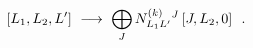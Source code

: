 \begin{equation}\label{mmDAflowI}
[L_{1},L_{2},L']\ \longrightarrow \ \makebox[6cm][l]{$\displaystyle\bigoplus_{J}
N^{(k)}_{L_{1}L'}{}^{J}\, [J,L_{2},0] \ \ .$}
\end{equation}

